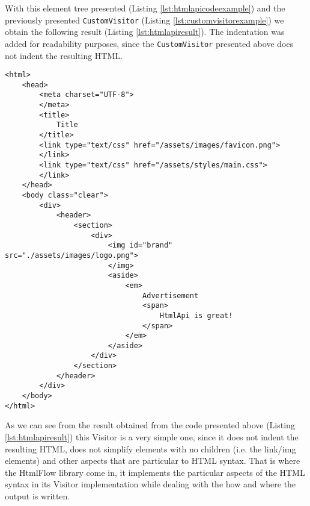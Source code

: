 \noindent
With this element tree presented (Listing \ref{lst:htmlapicodeexample}) and the previously presented \texttt{CustomVisitor} (Listing \ref{lst:customvisitorexample}) we obtain the following result (Listing \ref{lst:htmlapiresult}). The indentation was added for readability purposes, since the \texttt{CustomVisitor} presented above does not indent the resulting \ac{HTML}.

\bigskip


\begin{minipage}{\linewidth}
\begin{lstlisting}[caption={HtmlApi Visitor Result},captionpos=b,label={lst:htmlapiresult}]
<html>
    <head>
        <meta charset="UTF-8">
        </meta>
        <title>
            Title
        </title>
        <link type="text/css" href="/assets/images/favicon.png">
        </link>
        <link type="text/css" href="/assets/styles/main.css">
        </link>
    </head>
    <body class="clear">
        <div>
            <header>
                <section>
                    <div>
                        <img id="brand" src="./assets/images/logo.png">
                        </img>
                        <aside>
                            <em>
                                Advertisement
                                <span>
                                    HtmlApi is great!
                                </span>
                            </em>
                        </aside>
                    </div>
                </section>
            </header>
        </div>
    </body>
</html>                          
\end{lstlisting}
\end{minipage}

\noindent
As we can see from the result obtained from the code presented above (Listing \ref{lst:htmlapiresult}) this Visitor is a very simple one, since it does not indent the resulting \ac{HTML}, does not simplify elements with no children (i.e. the link/img elements) and other aspects that are particular to \ac{HTML} syntax. That is where the HtmlFlow library come in, it implements the particular aspects of the \ac{HTML} syntax in its Visitor implementation while dealing with the how and where the output is written. 